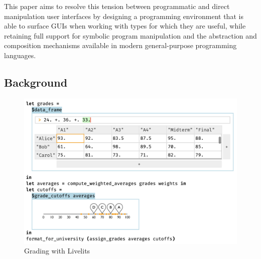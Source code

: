 
This paper aims to resolve this tension between
programmatic and direct manipulation user interfaces by designing 
a programming environment that
is able to surface GUIs when working with types for which
they are useful, while retaining full support for symbolic program manipulation
and the abstraction and composition mechanisms
available in modern general-purpose programming languages.

\subsection{Background}
\begin{figure}
  \includegraphics[width=29pc]{grade-cutoff-livelit.png}
\caption{Grading with Livelits}
\label{fig:grading}
\label{fig:color}
\end{figure}

